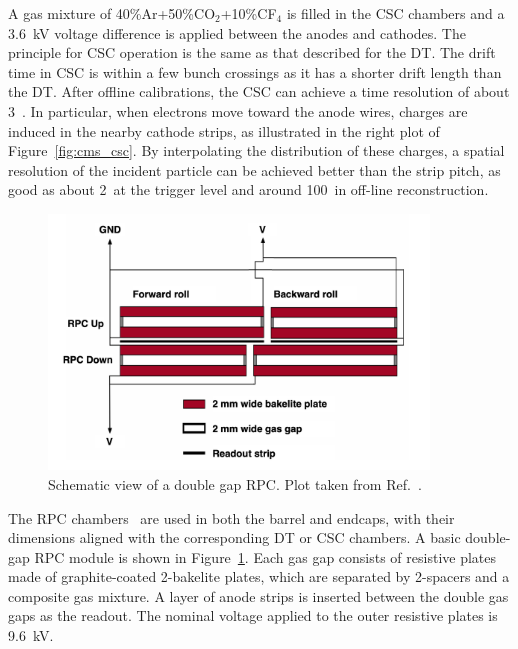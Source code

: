 A gas mixture of 40\%Ar+50\%CO$_{2}$+10\%CF$_{4}$ is filled in the CSC chambers and 
a 3.6~kV voltage difference is applied between the anodes and cathodes.
The principle for CSC operation is the same as that described for the DT.
The drift time in CSC is within a few bunch crossings as it has a shorter drift length than the DT.
After offline calibrations, the CSC can achieve a time resolution of about 3~\ns.
In particular, when electrons move toward the anode wires, charges are induced in the nearby cathode strips, as illustrated in the right plot of Figure~\ref{fig:cms_csc}.
By interpolating the distribution of these charges, a spatial resolution of the incident particle can be achieved better than the strip pitch,
as good as about 2~\mm at the trigger level and around 100~\mum in off-line reconstruction.  

\begin{figure}[!htb]
    \centering
    \captionsetup{justification=centering}
    \includegraphics[width=0.90\textwidth]{pics/LHC_CMS/RPC.png}
    \caption{Schematic view of a double gap RPC.
             Plot taken from Ref.~\cite{collaboration_2013}.}
    \label{fig:cms_rpc}
\end{figure}

The RPC chambers~\cite{Collaboration_2008, collaboration_2013} are used in both the barrel and endcaps, with their dimensions aligned with the corresponding DT or CSC chambers.
A basic double-gap RPC module is shown in Figure~\ref{fig:cms_rpc}. 
Each gas gap consists of resistive plates made of graphite-coated 2-\mm bakelite plates, 
which are separated by 2-\mm spacers and a composite gas mixture.
A layer of anode strips is inserted between the double gas gaps as the readout.
The nominal voltage applied to the outer resistive plates is 9.6~kV.

